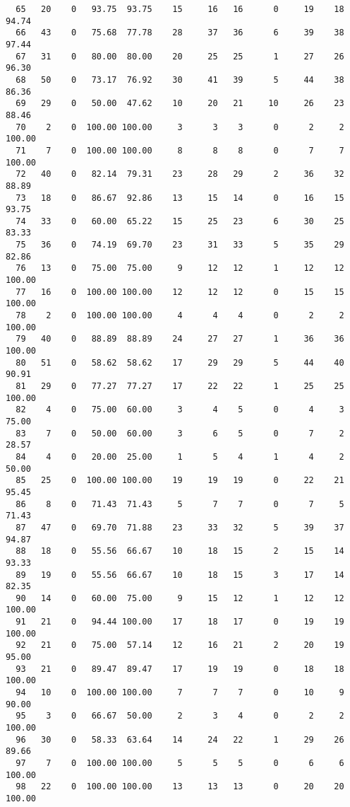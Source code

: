 \begin{verbatim}
  65   20    0   93.75  93.75    15     16   16      0     19    18    94.74
  66   43    0   75.68  77.78    28     37   36      6     39    38    97.44
  67   31    0   80.00  80.00    20     25   25      1     27    26    96.30
  68   50    0   73.17  76.92    30     41   39      5     44    38    86.36
  69   29    0   50.00  47.62    10     20   21     10     26    23    88.46
  70    2    0  100.00 100.00     3      3    3      0      2     2   100.00
  71    7    0  100.00 100.00     8      8    8      0      7     7   100.00
  72   40    0   82.14  79.31    23     28   29      2     36    32    88.89
  73   18    0   86.67  92.86    13     15   14      0     16    15    93.75
  74   33    0   60.00  65.22    15     25   23      6     30    25    83.33
  75   36    0   74.19  69.70    23     31   33      5     35    29    82.86
  76   13    0   75.00  75.00     9     12   12      1     12    12   100.00
  77   16    0  100.00 100.00    12     12   12      0     15    15   100.00
  78    2    0  100.00 100.00     4      4    4      0      2     2   100.00
  79   40    0   88.89  88.89    24     27   27      1     36    36   100.00
  80   51    0   58.62  58.62    17     29   29      5     44    40    90.91
  81   29    0   77.27  77.27    17     22   22      1     25    25   100.00
  82    4    0   75.00  60.00     3      4    5      0      4     3    75.00
  83    7    0   50.00  60.00     3      6    5      0      7     2    28.57
  84    4    0   20.00  25.00     1      5    4      1      4     2    50.00
  85   25    0  100.00 100.00    19     19   19      0     22    21    95.45
  86    8    0   71.43  71.43     5      7    7      0      7     5    71.43
  87   47    0   69.70  71.88    23     33   32      5     39    37    94.87
  88   18    0   55.56  66.67    10     18   15      2     15    14    93.33
  89   19    0   55.56  66.67    10     18   15      3     17    14    82.35
  90   14    0   60.00  75.00     9     15   12      1     12    12   100.00
  91   21    0   94.44 100.00    17     18   17      0     19    19   100.00
  92   21    0   75.00  57.14    12     16   21      2     20    19    95.00
  93   21    0   89.47  89.47    17     19   19      0     18    18   100.00
  94   10    0  100.00 100.00     7      7    7      0     10     9    90.00
  95    3    0   66.67  50.00     2      3    4      0      2     2   100.00
  96   30    0   58.33  63.64    14     24   22      1     29    26    89.66
  97    7    0  100.00 100.00     5      5    5      0      6     6   100.00
  98   22    0  100.00 100.00    13     13   13      0     20    20   100.00

\end{verbatim}
